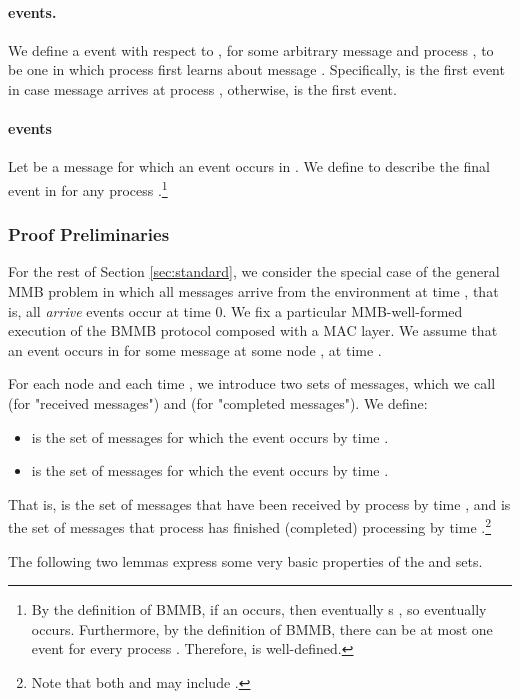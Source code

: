 \paragraph{ events.}
We define a  event with respect to ,
for some arbitrary message  and process ,
to be one in which process  first learns about message .
Specifically,  is the first  event
in case message  arrives at
process ,
otherwise,  is the first  event.

\paragraph{ events}
Let  be a message for which an  event
occurs in .  We define  to describe the final
 event in  for any process .\footnote{
  By the definition of BMMB, if an  occurs, then 
  eventually s , so  eventually occurs. Furthermore,
  by the definition of BMMB, there can be at most one  event for
  every process . Therefore,  is well-defined.}



\subsubsection{Proof Preliminaries}
\label{subsec:Proof Prelim}

For the rest of Section \ref{sec:standard}, we consider the special case of the general MMB problem
in which all messages arrive from the environment at time , that is, all {\em arrive} events occur at time 0.
We fix a particular MMB-well-formed execution  of the BMMB protocol composed with a MAC layer.
We assume that an  event occurs in  for
some message  at some node , at time .

For each node  and each time , we introduce two sets of messages,
which we call  (for "received messages") and  (for "completed messages").
We define:
\begin{itemize}
\item
 is the set of messages  for which the   event occurs by time .
\item
 is the set of messages
 for which the  event occurs by time
.
\end{itemize}
That is,  is the set of messages that have been received by
process  by time , and  is the set of messages that
process  has finished (completed) processing by time .\footnote{
Note that both  and  may include .}



The following two lemmas express some very basic properties of the  and  sets.


